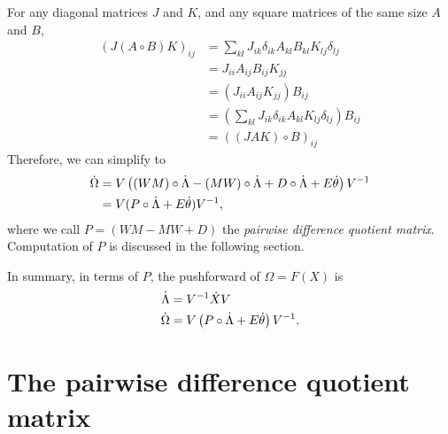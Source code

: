 \documentclass[../main.tex]{subfiles}
\begin{document}
\begin{refsection}
For any diagonal matrices $J$ and $K$, and any square matrices of the same size $A$ and $B$,
\begin{align*}
(J (A \circ B) K)_{ij} &= \sum_{kl} J_{ik} \delta_{ik} A_{kl} B_{kl} K_{lj} \delta_{lj}\\
&= J_{ii} A_{ij} B_{ij} K_{jj}\\
&= \left( J_{ii} A_{ij} K_{jj} \right) B_{ij}\\
&= \left( \sum_{kl} J_{ik} \delta_{ik} A_{kl} K_{lj} \delta_{lj} \right) B_{ij}\\
&= \left( \left( JAK \right) \circ B \right)_{ij}
\end{align*}
Therefore, we can simplify to
\begin{align*}
\dot{\Omega}
  &= V \left( (W M) \circ \dot{\Lambda} - (M W) \circ \dot{\Lambda} + D \circ \dot{\Lambda} + E \dot{\theta} \right) V^{-1}\\
  &= V (P \circ \dot{\Lambda} + E \dot{\theta}) V^{-1},
\end{align*}
where we call $P = (W M - M W + D)$ the \emph{pairwise difference quotient matrix}.
Computation of $P$ is discussed in the following section.

In summary, in terms of $P$, the pushforward of $\Omega = F(X)$ is
\begin{align*}
\dot{\Lambda} &= V^{-1} \dot{X} V\\
\dot{\Omega} &= V \left( P \circ \dot{\Lambda} + E \dot{\theta} \right) V^{-1}.
\end{align*}
\section{The pairwise difference quotient matrix}\label{the-pairwise-difference-quotient-matrix}


\end{refsection}
\end{document}

